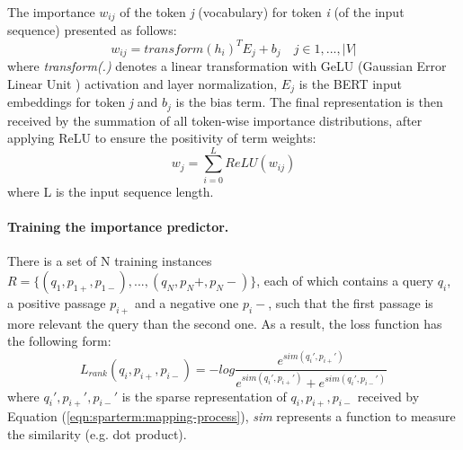\documentclass[
    twocolumn,
]{ceurart}
\begin{document}
    The importance $w_{ij}$ of the token \emph{j} (vocabulary) for token \emph{i} (of the input
    sequence) presented as follows:
    \begin{equation}
        w_{ij}=transform(h_i)^T E_j + b_j \quad j \in {1, ..., |V|}
    \end{equation}
    where \emph{transform(.)} denotes a linear transformation with GeLU
    (Gaussian Error Linear Unit \cite{hendrycks2016gelu}) activation and layer normalization,
    $E_j$ is the BERT input embeddings for token \emph{j} and $b_j$ is the bias term.
    The final representation is then received by the summation of all token-wise importance
    distributions, after applying ReLU to ensure the positivity of term weights:
    \begin{equation}
        \label{eqn:sparterm:importance-predictor}
        w_j=\sum_{i=0}^L ReLU(w_{ij})
    \end{equation}
    where L is the input sequence length.

    \paragraph{Training the importance predictor.}
    There is a set of N training instances $R=\{(q_1, p_{1+}, p_{1-}), ..., (q_N, p_N+, p_N-)\}$,
    each of which contains a query $q_i$, a positive passage $p_{i+}$ and a negative one $p_i-$,
    such that the first passage is more relevant the query than the second one.
    As a result, the loss function has the following form:
    \begin{equation}
        L_{rank}(q_i,p_{i+},p_{i-}) = -log \frac
        {e^{sim(q_i',p_{i+}')}}
        {e^{sim(q_i',p_{i+}')} + e^{sim(q_i',p_{i-}')}}
    \end{equation}
    where $q_i',p_{i+}',p_{i-}'$ is the sparse representation of $q_i,p_{i+},p_{i-}$
    received by Equation (\ref{eqn:sparterm:mapping-process}), \emph{sim} represents a function
    to measure the similarity (e.g. dot product).
\end{document}

